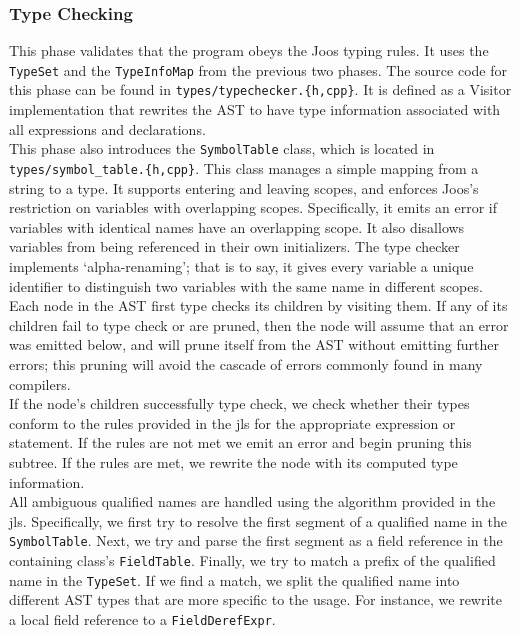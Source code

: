 \documentclass[12pt, titlepage]{article}
\newcommand{\z}[1]{\texttt{#1}}
\begin{document}
\subsubsection{Type Checking}\label{subsubsec:type-checking}

This phase validates that the program obeys the Joos typing rules. It uses the
\z{TypeSet} and the \z{TypeInfoMap} from the previous two phases. The source code
for this phase can be found in \z{types/typechecker.\{h,cpp\}}. It is defined as a
Visitor implementation that rewrites the AST to have type information
associated with all expressions and declarations.\\

This phase also introduces the \z{SymbolTable} class, which is located in
\z{types/symbol\_table.\{h,cpp\}}. This class manages a simple mapping from a string
to a type. It supports entering and leaving scopes, and enforces Joos's
restriction on variables with overlapping scopes. Specifically, it emits an error if
variables with identical names have an overlapping scope. It also disallows
variables from being referenced in their own initializers. The type checker
implements `alpha-renaming'; that is to say, it gives every variable a unique
identifier to distinguish two variables with the same name in different scopes.\\

Each node in the AST first type checks its children by visiting them. If any of
its children fail to type check or are pruned, then the node will assume that
an error was emitted below, and will prune itself from the AST without emitting
further errors; this pruning will avoid the cascade of errors commonly found in
many compilers.\\
If the node's children successfully type check, we check whether their types conform to the rules provided in the \ac{jls} for the appropriate expression or statement. If the rules are not met we emit an error and begin pruning this subtree. If the rules are met, we rewrite the node with its computed type information. \\

All ambiguous qualified names are handled using the algorithm provided in the
\ac{jls}. Specifically, we first try to resolve the first segment of a
qualified name in the \z{SymbolTable}. Next, we try and parse the first segment
as a field reference in the containing class's \z{FieldTable}. Finally, we try to
match a prefix of the qualified name in the \z{TypeSet}. If we find a match, we
split the qualified name into different AST types that are more specific to the
usage. For instance, we rewrite a local field reference to a \z{FieldDerefExpr}.
\end{document}

